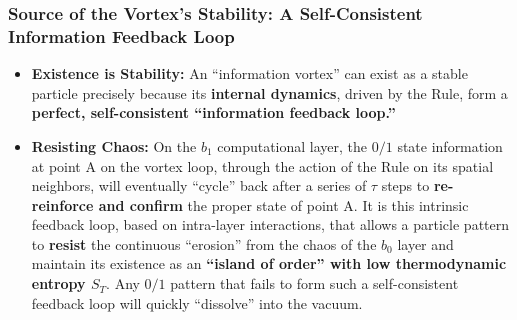 \documentclass[11pt, a4paper]{article}
\begin{document}
\subsubsection{Source of the Vortex's Stability: A Self-Consistent Information Feedback Loop}
\begin{itemize}
    \item \textbf{Existence is Stability:} An ``information vortex'' can exist as a stable particle precisely because its \textbf{internal dynamics}, driven by the Rule, form a \textbf{perfect, self-consistent ``information feedback loop.''}
    \item \textbf{Resisting Chaos:} On the $b_1$ computational layer, the $0/1$ state information at point A on the vortex loop, through the action of the Rule on its spatial neighbors, will eventually ``cycle'' back after a series of $\tau$ steps to \textbf{re-reinforce and confirm} the proper state of point A. It is this intrinsic feedback loop, based on intra-layer interactions, that allows a particle pattern to \textbf{resist} the continuous ``erosion'' from the chaos of the $b_0$ layer and maintain its existence as an \textbf{``island of order'' with low thermodynamic entropy $S_T$}. Any $0/1$ pattern that fails to form such a self-consistent feedback loop will quickly ``dissolve'' into the vacuum.
\end{itemize}
\end{document}
